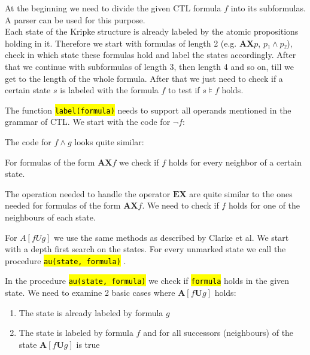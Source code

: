 \documentclass[a4paper, 12pt]{article}
\newcommand{\codeinput}[1]
{
    \begin{leftbar}
        {\fontsize{9pt}{11pt}}
    \end{leftbar}
}
\newcommand{\code}[1]
{
    \hl{\texttt{#1}}
}
\begin{document}
At the beginning we need to divide the given CTL formula $f$ into its
subformulas. A parser can be used for this purpose.\\

Each state of the Kripke structure is already labeled by the atomic
propositions holding in it. Therefore we start with formulas of length 2 (e.g.
$\mathbf{AX} p$, $p₁ ∧ p₂$), check in which state these formulas hold and
label the states accordingly. After that we continue with subformulas of
length 3, then length 4 and so on, till we get to the length of the whole
formula. After that we just need to check if a certain state $s$ is labeled
with the formula $f$ to test if $s⊧f$ holds.

\codeinput{model_check}

The function \code{label(formula)} needs to support all operands mentioned in
the grammar of CTL. We start with the code for $¬f$:

\codeinput{label_not}

The code for $f ∧ g$ looks quite similar:

\codeinput{label_or}

For formulas of the form $\mathbf{AX} f$ we check if $f$ holds for every
neighbor of a certain state.

\codeinput{label_AX}

The operation needed to handle the operator $\mathbf{EX}$ are quite similar to
the ones needed for formulas of the form $\mathbf{AX} f$. We need to check if
$f$ holds for one of the neighbours of each state.

\codeinput{label_EX}

For $A[f U g]$ we use the same methods as described by Clarke et al. We start
with a depth first search on the states. For every unmarked state we call the
procedure \code{au(state, formula)}.

\codeinput{label_AU}

In the procedure \code{au(state, formula)} we check if \code{formula} holds in
the given state. We need to examine 2 basic cases where $\textbf{A}[f
\textbf{U} g]$ holds:

\begin{enumerate}

    \item The state is already labeled by formula $g$

    \item The state is labeled by formula $f$ and for all successors
    (neighbours) of the state $\textbf{A}[f \textbf{U}g]$ is true

\end{enumerate}
\end{document}
